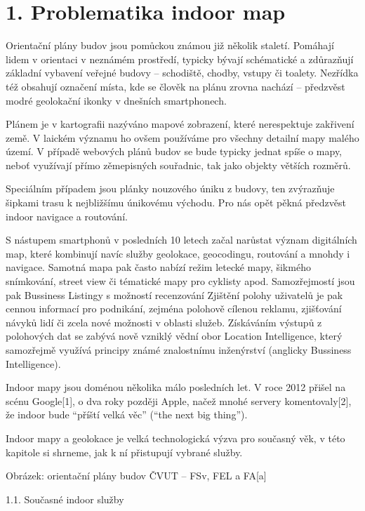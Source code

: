 
\chapter{1. Problematika indoor map}



Orientační plány budov jsou pomůckou známou již několik staletí. Pomáhají lidem v orientaci v neznámém prostředí, typicky bývají schématické a zdůrazňují základní vybavení veřejné budovy – schodiště, chodby, vstupy či toalety. Nezřídka též obsahují označení místa, kde se člověk na plánu zrovna nachází – předzvěst modré geolokační ikonky v dnešních smartphonech.

Plánem je v kartografii nazýváno mapové zobrazení, které nerespektuje zakřivení země. V laickém významu ho ovšem používáme pro všechny detailní mapy malého území. V případě webových plánů budov se bude typicky jednat spíše o mapy, neboť využívají přímo zěmepisných souřadnic, tak jako objekty větších rozměrů.

Speciálním případem jsou plánky nouzového úniku z budovy, ten zvýrazňuje šipkami trasu k nejbližšímu únikovému východu. Pro nás opět pěkná předzvěst indoor navigace a routování.

S nástupem smartphonů v posledních 10 letech začal narůstat význam digitálních map, které kombinují navíc služby geolokace, geocodingu, routování a mnohdy i navigace. Samotná mapa pak často nabízí režim letecké mapy, šikmého snímkování, street view či tématické mapy pro cyklisty apod. Samozřejmostí jsou pak Bussiness Listingy s možností recenzování  Zjištění polohy uživatelů je pak cennou informací pro podnikání, zejména polohově cílenou reklamu, zjišťování návyků lidí či zcela nové možnosti v oblasti služeb. Získáváním výstupů z polohových dat se zabývá nově vzniklý vědní obor Location Intelligence, který samozřejmě využívá principy známé znalostnímu inženýrství (anglicky Bussiness Intelligence).

Indoor mapy jsou doménou několika málo posledních let. V roce 2012 přišel na scénu Google[1], o dva roky později Apple, načež mnohé servery komentovaly[2], že indoor bude “příští velká věc” (“the next big thing”).

Indoor mapy a geolokace je velká technologická výzva pro současný věk, v této kapitole si shrneme, jak k ní přistupují vybrané služby.



Obrázek: orientační plány budov ČVUT – FSv, FEL a FA[a]

1.1. Současné indoor služby



